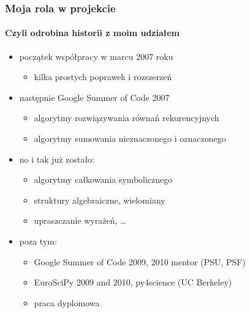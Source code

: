\documentclass[10pt,polish]{beamer}
\begin{document}
\begin{frame}
    \frametitle{Moja rola w projekcie}
    \framesubtitle{Czyli odrobina historii z moim udziałem}

    \begin{itemize}
        \item początek współpracy w marcu 2007 roku
            \begin{itemize}
                \item kilka prostych poprawek i rozszerzeń
            \end{itemize}
            \pause
        \item następnie Google Summer of Code 2007
            \begin{itemize}
                \item algorytmy rozwiązywania równań rekurencyjnych
                \item algorytmy sumowania nieznaczonego i oznaczonego
            \end{itemize}
            \pause
        \item no i tak już zostało:
            \begin{itemize}
                \item algorytmy całkowania symbolicznego
                \item struktury algebraiczne, wielomiany
                \item upraszczanie wyrażeń, \ldots
            \end{itemize}
            \pause
        \item poza tym:
            \begin{itemize}
                \item Google Summer of Code 2009, 2010 mentor (PSU, PSF)
                \item EuroSciPy 2009 and 2010, py4science (UC Berkeley)
                \item praca dyplomowa
            \end{itemize}
    \end{itemize}
\end{frame}
\end{document}
